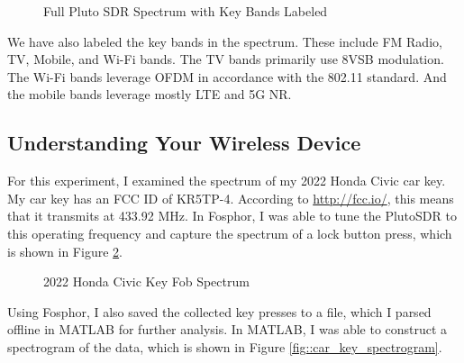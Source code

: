 \documentclass{article}
\begin{document}
\begin{figure}[H]
	\centerline{}
	\caption{Full Pluto SDR Spectrum with Key Bands Labeled}
	\label{fig::full_spectrum_labeled}
\end{figure}

We have also labeled the key bands in the spectrum. These include FM Radio, TV, Mobile, and Wi-Fi bands. The TV bands primarily use 8VSB modulation. The Wi-Fi bands leverage OFDM in accordance with the 802.11 standard. And the mobile bands leverage mostly LTE and 5G NR.

\subsection{Understanding Your Wireless Device}

For this experiment, I examined the spectrum of my 2022 Honda Civic car key. My car key has an FCC ID of KR5TP-4. According to \url{http://fcc.io/}, this means that it transmits at 433.92 MHz. In Fosphor, I was able to tune the PlutoSDR to this operating frequency and capture the spectrum of a lock button press, which is shown in Figure \ref{fig::car_key_spectrum}.

\begin{figure}[H]
	\centerline{}
	\caption{2022 Honda Civic Key Fob Spectrum}
	\label{fig::car_key_spectrum}
\end{figure}

Using Fosphor, I also saved the collected key presses to a file, which I parsed offline in MATLAB for further analysis. In MATLAB, I was able to construct a spectrogram of the data, which is shown in Figure \ref{fig::car_key_spectrogram}.
\end{document}
